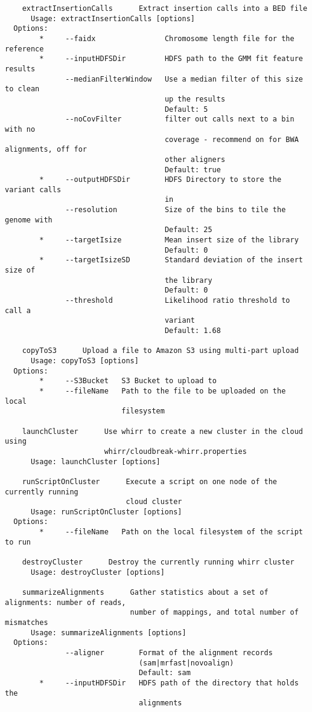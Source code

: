\documentclass[11pt]{article}
\begin{document}
\begin{verbatim}
    extractInsertionCalls      Extract insertion calls into a BED file
      Usage: extractInsertionCalls [options]
  Options:
        *     --faidx                Chromosome length file for the reference
        *     --inputHDFSDir         HDFS path to the GMM fit feature results
              --medianFilterWindow   Use a median filter of this size to clean
                                     up the results
                                     Default: 5
              --noCovFilter          filter out calls next to a bin with no
                                     coverage - recommend on for BWA alignments, off for
                                     other aligners
                                     Default: true
        *     --outputHDFSDir        HDFS Directory to store the variant calls
                                     in
              --resolution           Size of the bins to tile the genome with
                                     Default: 25
        *     --targetIsize          Mean insert size of the library
                                     Default: 0
        *     --targetIsizeSD        Standard deviation of the insert size of
                                     the library
                                     Default: 0
              --threshold            Likelihood ratio threshold to call a
                                     variant
                                     Default: 1.68

    copyToS3      Upload a file to Amazon S3 using multi-part upload
      Usage: copyToS3 [options]
  Options:
        *     --S3Bucket   S3 Bucket to upload to
        *     --fileName   Path to the file to be uploaded on the local
                           filesystem

    launchCluster      Use whirr to create a new cluster in the cloud using 
                       whirr/cloudbreak-whirr.properties
      Usage: launchCluster [options]

    runScriptOnCluster      Execute a script on one node of the currently running 
                            cloud cluster
      Usage: runScriptOnCluster [options]
  Options:
        *     --fileName   Path on the local filesystem of the script to run

    destroyCluster      Destroy the currently running whirr cluster
      Usage: destroyCluster [options]

    summarizeAlignments      Gather statistics about a set of alignments: number of reads, 
                             number of mappings, and total number of mismatches
      Usage: summarizeAlignments [options]
  Options:
              --aligner        Format of the alignment records
                               (sam|mrfast|novoalign)
                               Default: sam
        *     --inputHDFSDir   HDFS path of the directory that holds the
                               alignments


\end{verbatim}
\end{document}
